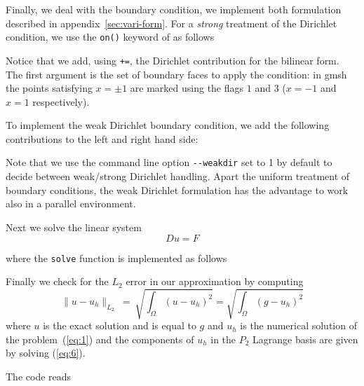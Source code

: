 


Finally, we deal with the boundary condition, we implement both
formulation described in appendix~\ref{sec:vari-form}. For a
\emph{strong} treatment of the Dirichlet condition, we use the
\lstinline!on()! keyword of \feel as follows



Notice that we add, using \lstinline!+=!, the Dirichlet contribution
for the bilinear form. The first argument is the set of boundary faces
to apply the condition: in gmsh the points satisfying $x=\pm 1$ are
marked using the flags $1$ and $3$ ($x=-1$ and $x=1$ respectively).

To implement the weak Dirichlet boundary condition, we add the
following contributions to the left and right hand side:




Note that we use the command line option \lstinline!--weakdir! set to
1 by default to decide between weak/strong Dirichlet handling.  Apart
the uniform treatment of boundary conditions, the weak Dirichlet
formulation has the advantage to work also in a parallel environment.

Next we solve the linear system
\begin{equation}
  \label{eq:6}
  D u = F
\end{equation}

where the \lstinline!solve! function is implemented as follows



Finally we check for the $L_2$ error in our approximation by computing
\begin{equation}
  \label{eq:7}
  \|u-u_h\|_{L_2}\ =\ \sqrt{\int_\Omega (u-u_h)^2} = \sqrt{\int_\Omega (g-u_h)^2}
\end{equation}
where $u$ is the exact solution and is equal to $g$ and $u_h$ is the
numerical solution of the problem~(\ref{eq:1}) and the components of
$u_h$ in the $P_2$ Lagrange basis are given by solving (\ref{eq:6}).

The code reads




